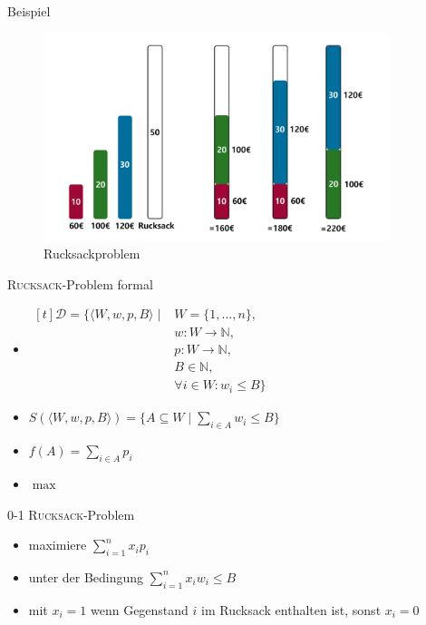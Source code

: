 \begin{frame}{Beispiel}
    \begin{figure}[ht]
    	\centering
    	\includegraphics[width=0.9\textwidth]{img/Rucksack.pdf}
    	\caption{Rucksackproblem}
    	\label{fig:rucksack}
    \end{figure}
\end{frame}
\begin{frame}{\textsc{Rucksack}-Problem formal}
    \begin{itemize}
        \item $\begin{aligned}[t] \displaystyle
            \mathcal{D}=\{\langle W,w,p,B \rangle \mid & W=\{1,...,n\}, & \\
                                                                & w \colon W \to \mathbb{N}, & \\
                                                                & p \colon W \to \mathbb{N}, & \\
                                                                & B \in \mathbb{N}, & \\
                                                                & \forall i \in W \colon w_i \leq B\}
         \end{aligned}$
        
        \item $\displaystyle S( \langle W, w, p, B \rangle )=\{ A \subseteq W \mid \sum_{i\in A}{ w_i} \leq B \}$
        \item $\displaystyle f(A)=\sum_{i\in A}{p_i}$
        \item $\displaystyle \max$
    \end{itemize}
\end{frame}
\begin{frame}{0-1 \textsc{Rucksack}-Problem}
\begin{itemize}
	\item maximiere $\displaystyle \sum_{i=1}^{n}{x_i p_i}$
       
    \item unter der Bedingung $\displaystyle \sum_{i=1}^{n}{x_i w_i \leq B}$
       
     \item mit $x_i=1$ wenn Gegenstand $i$ im Rucksack enthalten ist, sonst $x_i=0$
\end{itemize}
\end{frame}
